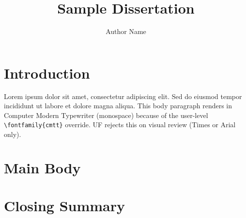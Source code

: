 \documentclass{ufdissertation}
\title{Sample Dissertation}
\author{Author Name}
\begin{document}
\chapter{Introduction}
\selectfont
Lorem ipsum dolor sit amet, consectetur adipiscing elit. Sed do
eiusmod tempor incididunt ut labore et dolore magna aliqua. This
body paragraph renders in Computer Modern Typewriter (monospace)
because of the user-level \texttt{\textbackslash{}fontfamily\{cmtt\}}
override. UF rejects this on visual review (Times or Arial only).
\chapter{Main Body}
\chapter{Closing Summary}
\end{document}
